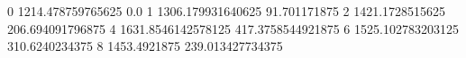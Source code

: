 0 1214.478759765625 0.0
1 1306.179931640625 91.701171875
2 1421.1728515625 206.694091796875
4 1631.8546142578125 417.3758544921875
6 1525.102783203125 310.6240234375
8 1453.4921875 239.013427734375
